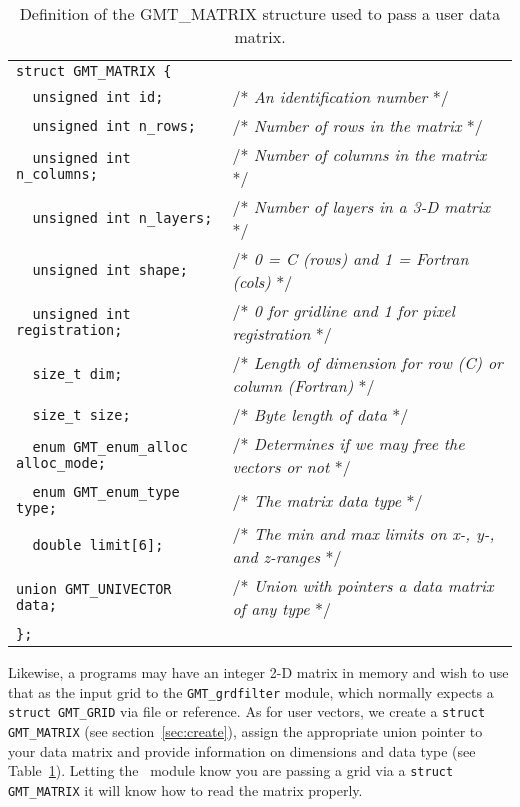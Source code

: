 \documentclass[11pt]{report}
\begin{document}
\begin{table}[h]
\small
\centering
\begin{tabular}{ll} \hline
\verb!struct GMT_MATRIX {!               & \\
\verb!  unsigned int id;!                & /* \emph{An identification number} */ \\
\verb!  unsigned int n_rows;!            & /* \emph{Number of rows in the matrix} */ \\
\verb!  unsigned int n_columns;!         & /* \emph{Number of columns in the matrix} */\\
\verb!  unsigned int n_layers;!          & /* \emph{Number of layers in a 3-D matrix} */\\
\verb!  unsigned int shape;!             & /* \emph{0 = C (rows) and 1 = Fortran (cols)} */\\
\verb!  unsigned int registration;!      & /* \emph{0 for gridline and 1 for pixel registration} */\\
\verb!  size_t dim;!                     & /* \emph{Length of dimension for row (C) or column (Fortran)} */\\
\verb!  size_t size;!                    & /* \emph{Byte length of data} */\\
\verb!  enum GMT_enum_alloc alloc_mode;! & /* \emph{Determines if we may free the vectors or not} */\\
\verb!  enum GMT_enum_type type;!        & /* \emph{The matrix data type} */\\
\verb!  double limit[6];!                & /* \emph{The min and max limits on x-, y-, and z-ranges} */\\
\verb!union GMT_UNIVECTOR data;!       & /* \emph{Union with pointers a data matrix of any type} */\\
\verb!};!                              & \\ \hline
\end{tabular}
\caption{Definition of the GMT\_MATRIX structure used to pass a user data matrix.}
\label{tbl:matrix}
\end{table}
\noindent
Likewise, a programs may have an integer 2-D matrix in memory 
and wish to use that as the input grid to the \texttt{GMT\_grdfilter} module, which normally
expects a \texttt{struct GMT\_GRID} via file or reference.  As for user vectors, we create a
\texttt{struct GMT\_MATRIX} (see section~\ref{sec:create}), assign the appropriate union pointer to your data
matrix and provide information on dimensions and data type (see Table~\ref{tbl:matrix}).
Letting the \GMT\ module know you are passing a grid via a
\texttt{struct GMT\_MATRIX} it will know how to read the matrix properly.
\end{document}
